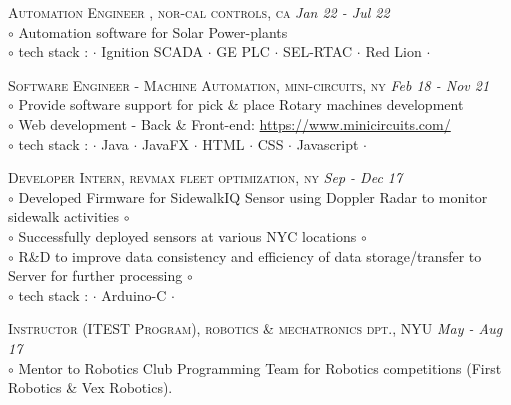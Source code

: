 \documentclass[a4paper]{article}
\begin{document}
\begin{spacing}{0.1}
\end{spacing}
%
\textsc	{	 	Automation Engineer	, nor-cal controls, ca																					} \hfill \emph {Jan 22 - Jul 22	}	\\
		{	$\circ$	Automation software for Solar Power-plants 																					}	\\
		{	$\circ$	tech stack : $\cdot$ Ignition SCADA $\cdot$ GE PLC $\cdot$ SEL-RTAC $\cdot$ Red Lion $\cdot$													}	\\
%
\begin{spacing}{0.1}
\end{spacing}
\textsc	{		Software Engineer - Machine Automation, mini-circuits, ny																		} \hfill \emph {Feb 18 - Nov 21	}	\\
		{	$\circ$ 	Provide software support for pick \& place Rotary machines development}	\\
		{	$\circ$ 	Web development - Back \& Front-end: \href{https://www.minicircuits.com/}{https://www.minicircuits.com/}}	\\
		{	$\circ$	tech stack : $\cdot$ Java $\cdot$ JavaFX $\cdot$ HTML $\cdot$ CSS $\cdot$ Javascript $\cdot$													}	\\
%
\begin{spacing}{0.1}
\end{spacing}
\textsc	{	 	Developer Intern, revmax fleet optimization, ny																						} \hfill \emph {Sep - Dec 17	}	\\
		{	$\circ$ 	Developed Firmware for SidewalkIQ Sensor using Doppler Radar to monitor sidewalk activities $\circ$													}	\\
		{	$\circ$ 	Successfully deployed sensors at various NYC locations $\circ$																					}	\\
		{	$\circ$ 	R\&D to improve data consistency and efficiency of data storage/transfer to Server for further processing $\circ$												}	\\
		{	$\circ$	tech stack : $\cdot$ Arduino-C $\cdot$ 																										}	\\
%
\begin{spacing}{0.1}
\end{spacing}
\textsc	{		Instructor (ITEST Program), robotics \& mechatronics dpt., NYU																				} \hfill \emph {May - Aug 17	}	\\
		{	$\circ$ 	Mentor to Robotics Club Programming Team for Robotics competitions (First Robotics \& Vex Robotics).												}	\\
\end{document}
